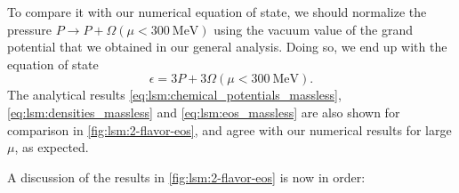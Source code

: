 To compare it with our numerical equation of state, we should normalize the pressure $P \rightarrow P + \Omega(\mu<\SI{300}{\mega\electronvolt})$ using the vacuum value of the grand potential that we obtained in our general analysis.
Doing so, we end up with the equation of state
\begin{equation}
	\epsilon = 3 P + 3 \Omega(\mu<\SI{300}{\mega\electronvolt}).
\label{eq:lsm:eos_massless}
\end{equation}
The analytical results \eqref{eq:lsm:chemical_potentials_massless}, \eqref{eq:lsm:densities_massless} and \eqref{eq:lsm:eos_massless} are also shown for comparison in \cref{fig:lsm:2-flavor-eos}, and agree with our numerical results for large $\mu$, as expected.

A discussion of the results in \cref{fig:lsm:2-flavor-eos} is now in order:
